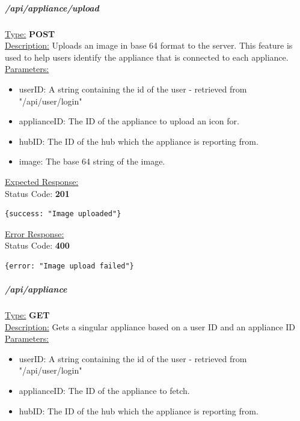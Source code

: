 \documentclass[draft,preprint,12pt,3p]{elsarticle}
\newcommand{\forceindent}{\leavevmode{\parindent=1em\indent}}
\begin{document}
\subparagraph*{/api/appliance/upload}
\underline{Type:} \textbf{POST}\\

\underline{Description:} Uploads an image in base 64 format to the server. This feature is used to help users identify the appliance that is connected to each appliance.\\

\underline{Parameters:}
\begin{itemize}
\item userID: A string containing the id of the user - retrieved from "/api/user/login"

\item applianceID: The ID of the appliance to upload an icon for.

\item hubID: The ID of the hub which the appliance is reporting from.

\item image: The base 64 string of the image.
\end{itemize}

\underline{Expected Response:}\\[5pt]
\forceindent Status Code: \textbf{201} \\
\begin{verbatim}
{success: "Image uploaded"}
\end{verbatim}
\underline{Error Response:}\\[5pt]
\forceindent Status Code: \textbf{400} \\
\begin{verbatim}
{error: "Image upload failed"}
\end{verbatim}

\subparagraph*{/api/appliance}
\underline{Type:} \textbf{GET}\\

\underline{Description:} Gets a singular appliance based on a user ID and an appliance ID\\

\underline{Parameters:}
\begin{itemize}
\item userID: A string containing the id of the user - retrieved from "/api/user/login"

\item applianceID: The ID of the appliance to fetch.

\item hubID: The ID of the hub which the appliance is reporting from.

\end{itemize}
\end{document}
